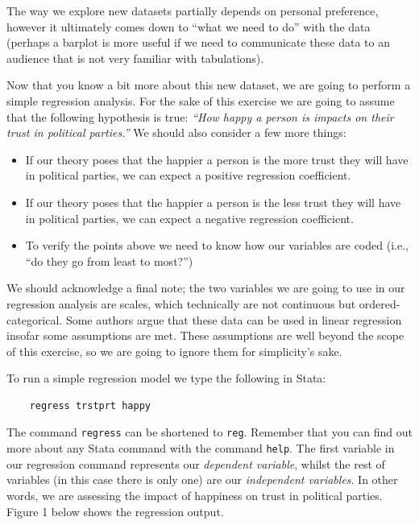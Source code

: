 The way we explore new datasets partially depends on personal preference, however it ultimately comes down to ``what we need to do'' with the data (perhaps a barplot is more useful if we need to communicate these data to an audience that is not very familiar with tabulations).

Now that you know a bit more about this new dataset, we are going to perform a simple regression analysis. For the sake of this exercise we are going to assume that the following hypothesis is true: \textit{``How happy a person is impacts on their trust in political parties.''} We should also consider a few more things:

\begin{itemize}
	\item If our theory poses that the happier a person is the more trust they will have in political parties, we can expect a positive regression coefficient.
	\item If our theory poses that the happier a person is the less trust they will have in political parties, we can expect a negative regression coefficient.
	\item To verify the points above we need to know how our variables are coded (i.e., ``do they go from least to most?'')
\end{itemize}

We should acknowledge a final note; the two variables we are going to use in our regression analysis are scales, which technically are not continuous but ordered-categorical. Some authors argue that these data can be used in linear regression insofar some assumptions are met. These assumptions are well beyond the scope of this exercise, so we are going to ignore them for simplicity's sake.

To run a simple regression model we type the following in Stata:

\begin{lstlisting}
	regress trstprt happy
\end{lstlisting}

The command \texttt{regress} can be shortened to \texttt{reg}. Remember that you can find out more about any Stata command with the command \texttt{help}. The first variable in our regression command represents our \textit{dependent variable}, whilst the rest of variables (in this case there is only one) are our \textit{independent variables}. In other words, we are assessing the impact of happiness on trust in political parties. Figure 1 below shows the regression output.

